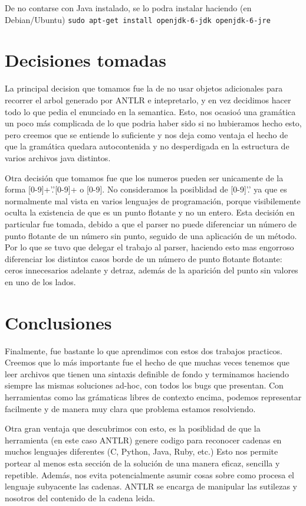 \documentclass[a4paper]{article}
\begin{document}
De no contarse con Java instalado, se lo podra instalar haciendo (en Debian/Ubuntu)
\hbox{\texttt{sudo apt-get install openjdk-6-jdk openjdk-6-jre }}

\section{Decisiones tomadas}
La principal decision que tomamos fue la de no usar objetos adicionales para
recorrer el arbol generado por ANTLR e intepretarlo, y en vez decidimos hacer
todo lo que pedia el enunciado en la semantica. Esto, nos ocasio\'o una gram\'atica
un poco m\'as complicada de lo que podria haber sido si no hubieramos hecho esto,
pero creemos que se entiende lo suficiente y nos deja como ventaja el hecho
de que la gram\'atica quedara autocontenida y no desperdigada en la estructura
de varios archivos java distintos.


Otra decisi\'on que tomamos fue que los numeros pueden ser unicamente de la forma
[0-9]+'.'[0-9]+ o [0-9]. No consideramos  la posiblidad de [0-9]'.' ya que es
normalmente mal vista en varios lenguajes de programaci\'on, porque visibilemente
oculta la existencia de que es un punto flotante y no un entero. Esta decisi\'on en 
particular fue tomada, debido a que el parser no puede diferenciar un n\'umero de 
punto flotante de un n\'umero sin punto, seguido de una aplicaci\'on de un m\'etodo. 
Por lo que se tuvo que delegar el trabajo al parser, haciendo esto mas engorroso 
diferenciar los distintos casos borde de un n\'umero de punto flotante flotante: 
ceros innecesarios adelante y detraz, adem\'as de la aparici\'on del punto sin 
valores en uno de los lados.


\section{Conclusiones}
Finalmente, fue bastante lo que aprendimos con estos dos trabajos practicos.
Creemos que lo m\'as importante fue el hecho de que muchas veces tenemos que
leer archivos que tienen una sintaxis definible de fondo y terminamos haciendo
siempre las mismas soluciones ad-hoc, con todos los bugs que presentan. Con
herramientas como las gr\'amaticas libres de contexto encima, podemos representar
facilmente y de manera muy clara que problema estamos resolviendo.

Otra gran ventaja que descubrimos con esto, es la posiblidad de que la herramienta
(en este caso ANTLR) genere codigo para reconocer cadenas en muchos lenguajes
diferentes (C, Python, Java, Ruby, etc.) Esto nos permite portear al menos 
esta secci\'on de la soluci\'on de una manera eficaz, sencilla y repetible. 
Adem\'as, nos evita potencialmente asumir cosas sobre como procesa el lenguaje
subyacente las cadenas. ANTLR se encarga de manipular las sutilezas y nosotros
del contenido de la cadena leida.
\end{document}
